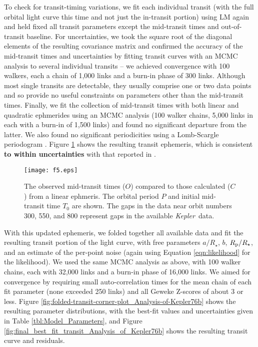 \documentclass[manuscript]{aastex62}
\newcommand{\kepler}{{\it Kepler}}
\begin{document}
To check for transit-timing variations, we fit each individual transit (with the full orbital light curve this time and not just the in-transit portion) using LM again and held fixed all transit parameters except the mid-transit times and out-of-transit baseline. For uncertainties, we took the square root of the diagonal elements of the resulting covariance matrix \citep[p.~790]{Press:2007:NRE:1403886} and confirmed the accuracy of the mid-transit times and uncertainties by fitting transit curves with an MCMC analysis \citep{2013PASP..125..306F} to several individual transits -- we achieved convergence with 100 walkers, each a chain of 1,000 links and a burn-in phase of 300 links. Although most single transits are detectable, they usually comprise one or two data points and so provide no useful constraints on parameters other than the mid-transit times. Finally, we fit the collection of mid-transit times with both linear and quadratic ephmerides using an MCMC analysis (100 walker chains, 5,000 links in each with a burn-in of 1,500 links) and found no significant departure from the latter. We also found no significant periodicities using a Lomb-Scargle periodogram \citep{1976Ap&SS..39..447L, 1982ApJ...263..835S}. Figure \ref{fig:TTVs_Analysis_of_Kepler76b} shows the resulting transit ephemeris, which is consistent \textbf{to within uncertainties} with that reported in \citet{2013ApJ...771...26F}. 

\begin{figure}
    \texttt{[image: f5.eps]}
    \caption{The observed mid-transit times ($O$) compared to those calculated ($C$) from a linear ephmeris. The orbital period $P$ and initial mid-transit time $T_0$ are shown. The gaps in the data near orbit numbers 300, 550, and 800 represent gaps in the available \kepler\ data.\label{fig:TTVs_Analysis_of_Kepler76b}}
\end{figure}

With this updated ephemeris, we folded together all available data and fit the resulting transit portion of the light curve, with free parameters $a/R_\star$, $b$, $R_{\rm p}/R_\star$, and an estimate of the per-point noise (again using Equation \ref{eqn:likelihood} for the likelihood). We used the same MCMC analysis as above, with 100 walker chains, each with 32,000 links and a burn-in phase of 16,000 links. We aimed for convergence by requiring small auto-correlation times \citep[e.g.,][]{geyer1992} for the mean chain of each fit parameter (none exceeded 250 links) and all Geweke Z-scores \citep{Geweke92evaluatingthe} of about 3 or less. Figure \ref{fig:folded-transit-corner-plot_Analysis-of-Kepler76b} shows the resulting parameter distributions, with the best-fit values and uncertainties given in Table \ref{tbl:Model_Parameters}, and Figure \ref{fig:final_best_fit_transit_Analysis_of_Kepler76b} shows the resulting transit curve and residuals.
\end{document}
